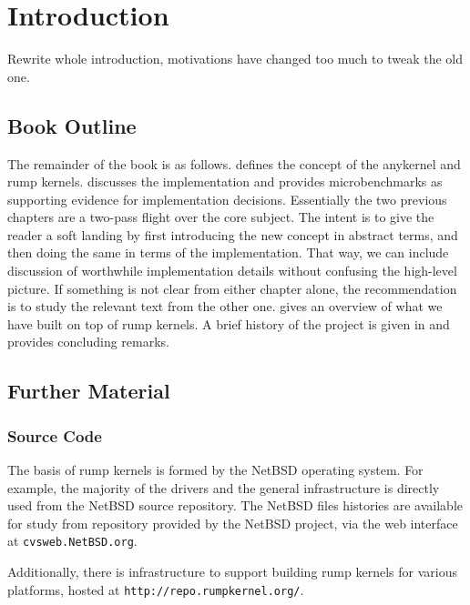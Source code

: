 
\section{Introduction}
\label{chap:introduction}

Rewrite whole introduction, motivations have changed too much to tweak
the old one.

\subsection{Book Outline}

The remainder of the book is as follows.   defines the
concept of the anykernel and rump kernels.  
discusses the implementation and provides microbenchmarks as supporting
evidence for implementation decisions.  Essentially the two previous
chapters are a two-pass flight over the core subject.  The intent is to
give the reader a soft landing by first introducing the new concept in
abstract terms, and then doing the same in terms of the implementation.
That way, we can include discussion of worthwhile implementation details
without confusing the high-level picture.  If something is not clear from
either chapter alone, the recommendation is to study the relevant text from
the other one.   gives an overview of what we have
built on top of rump kernels.  A brief history of the project is given
in  and  provides concluding remarks.


\subsection{Further Material}

\subsubsection{Source Code}
\label{sect:src}

The basis of rump kernels is formed by the NetBSD operating system.
For example, the majority of the drivers and the general infrastructure
is directly used from the NetBSD source repository.
The NetBSD files histories are available for study from repository
provided by the NetBSD project, \eg via the web interface at
\texttt{cvsweb.NetBSD.org}.

Additionally, there is infrastructure to support building rump kernels
for various platforms, hosted at \texttt{http://repo.rumpkernel.org/}.

